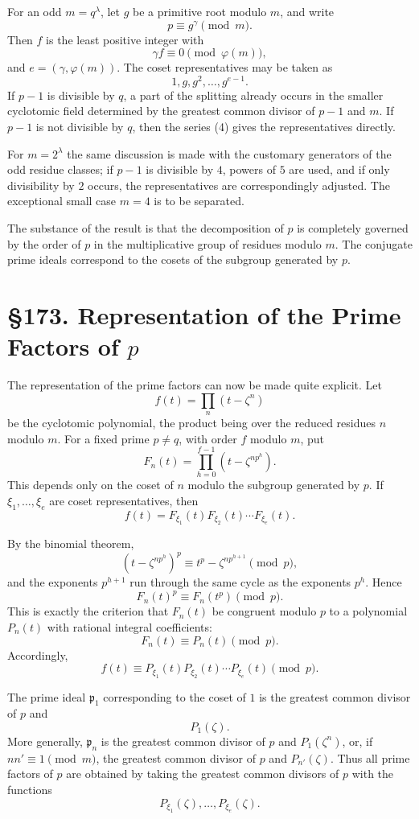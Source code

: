 \documentclass[12pt,a4paper]{article}
\newcommand{\webersection}[2]{\clearpage\section*{\S #1. #2}}
\newcommand{\p}{\mathfrak p}
\begin{document}
For an odd \(m=q^\lambda\), let \(g\) be a primitive root modulo \(m\), and write
\[
  p\equiv g^\gamma\pmod m.
\]
Then \(f\) is the least positive integer with
\[
  \gamma f\equiv0\pmod{\varphi(m)},
\]
and \(e=(\gamma,\varphi(m))\).  The coset representatives may be taken as
\[
  1,g,g^2,\ldots,g^{e-1}.
\tag{4}
\]
If \(p-1\) is divisible by \(q\), a part of the splitting already occurs in the smaller cyclotomic field determined by the greatest common divisor of \(p-1\) and \(m\).  If \(p-1\) is not divisible by \(q\), then the series (4) gives the representatives directly.

For \(m=2^\lambda\) the same discussion is made with the customary generators of the odd residue classes; if \(p-1\) is divisible by \(4\), powers of \(5\) are used, and if only divisibility by \(2\) occurs, the representatives are correspondingly adjusted.  The exceptional small case \(m=4\) is to be separated.

The substance of the result is that the decomposition of \(p\) is completely governed by the order of \(p\) in the multiplicative group of residues modulo \(m\).  The conjugate prime ideals correspond to the cosets of the subgroup generated by \(p\).

\webersection{173}{Representation of the Prime Factors of \(p\)}

The representation of the prime factors can now be made quite explicit.  Let
\[
  f(t)=\prod_n(t-\zeta^n)
\]
be the cyclotomic polynomial, the product being over the reduced residues \(n\) modulo \(m\).  For a fixed prime \(p\ne q\), with order \(f\) modulo \(m\), put
\[
  F_n(t)=\prod_{h=0}^{f-1}(t-\zeta^{np^h}).
\tag{1}
\]
This depends only on the coset of \(n\) modulo the subgroup generated by \(p\).  If \(\xi_1,\ldots,\xi_e\) are coset representatives, then
\[
  f(t)=F_{\xi_1}(t)F_{\xi_2}(t)\cdots F_{\xi_e}(t).
\tag{2}
\]

By the binomial theorem,
\[
  (t-\zeta^{np^h})^p\equiv t^p-\zeta^{np^{h+1}}\pmod p,
\]
and the exponents \(p^{h+1}\) run through the same cycle as the exponents \(p^h\).  Hence
\[
  F_n(t)^p\equiv F_n(t^p)\pmod p.
\tag{3}
\]
This is exactly the criterion that \(F_n(t)\) be congruent modulo \(p\) to a polynomial \(P_n(t)\) with rational integral coefficients:
\[
  F_n(t)\equiv P_n(t)\pmod p.
\tag{4}
\]
Accordingly,
\[
  f(t)\equiv P_{\xi_1}(t)P_{\xi_2}(t)\cdots P_{\xi_e}(t)\pmod p.
\tag{5}
\]

The prime ideal \(\p_1\) corresponding to the coset of \(1\) is the greatest common divisor of \(p\) and
\[
  P_1(\zeta).
\tag{6}
\]
More generally, \(\p_n\) is the greatest common divisor of \(p\) and \(P_1(\zeta^n)\), or, if \(nn'\equiv1\pmod m\), the greatest common divisor of \(p\) and \(P_{n'}(\zeta)\).  Thus all prime factors of \(p\) are obtained by taking the greatest common divisors of \(p\) with the functions
\[
  P_{\xi_1}(\zeta),\ldots,P_{\xi_e}(\zeta).
\tag{7}
\]
\end{document}
